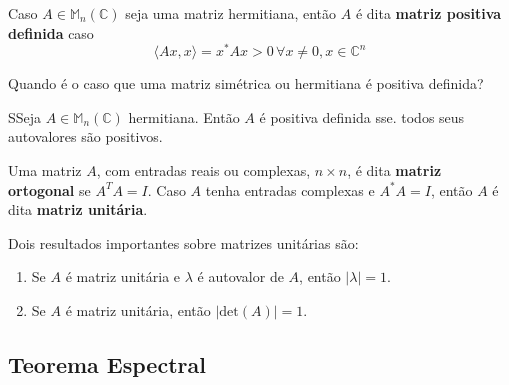 \documentclass[12pt,a4paper]{article}
\begin{document}
Caso $A \in \mathbb{M}_n(\mathbb{C})$ seja uma matriz hermitiana, então $A$ é dita \textbf{matriz positiva definida} caso
\[
\langle Ax, x \rangle = x^{\ast} A x > 0 \, \forall x \neq 0, x \in \mathbb{C}^n
\]

Quando é o caso que uma matriz simétrica ou hermitiana é positiva definida? 

\begin{teorema}{}
 SSeja $A \in \mathbb{M}_n(\mathbb{C})$ hermitiana. Então $A$ é positiva definida sse. todos seus autovalores são positivos.
\end{teorema}

Uma matriz $A$, com entradas reais ou complexas, $n \times n$, é dita \textbf{matriz ortogonal} se $A^T A = I$. Caso $A$ tenha entradas complexas e $A^{\ast} A = I$, então $A$ é dita \textbf{matriz unitária}.

Dois resultados importantes sobre matrizes unitárias são:

\begin{enumerate}
\item Se $A$ é matriz unitária e $\lambda$ é autovalor de $A$, então $| \lambda | = 1$.
\item Se $A$ é matriz unitária, então $| \text{det}(A) | = 1$.
\end{enumerate}

\subsection{Teorema Espectral}


\nocite{*}


\end{document}
